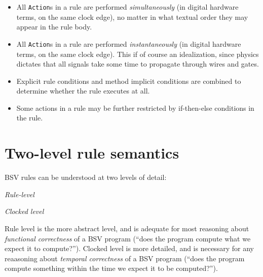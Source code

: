 \begin{itemize}

 \item All \verb|Action|s in a rule are performed
       \emph{simultaneously} (in digital hardware terms, on the same
       clock edge), no matter in what textual order they may appear in
       the rule body.

 \item All \verb|Action|s in a rule are performed
       \emph{instantaneously} (in digital hardware terms, on the same
       clock edge).  This if of course an idealization, since physics
       dictates that all signals take some time to propagate through
       wires and gates.

 \item Explicit rule conditions and method implicit conditions are
       combined to determine whether the rule executes at all.

 \item Some actions in a rule may be further restricted by
       if-then-else conditions in the rule.

\end{itemize}



\section{Two-level rule semantics}

\label{Sec_Two_Level_Semantics}


BSV rules can be understood at two levels of detail:

\begin{tightlist}

 \item \emph{Rule-level}

 \item \emph{Clocked level}

\end{tightlist}

Rule level is the more abstract level, and is adequate for most
reasoning about \emph{functional correctness} of a BSV program (``does
the program compute what we expect it to compute?'').  Clocked level
is more detailed, and is necessary for any reaasoning about
\emph{temporal correctness} of a BSV program (``does the program
compute something within the time we expect it to be computed?'').

